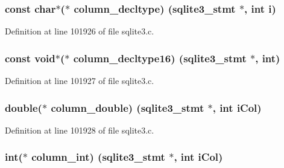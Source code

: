 \subsubsection[{column\+\_\+decltype}]{\setlength{\rightskip}{0pt plus 5cm}const char$\ast$($\ast$ column\+\_\+decltype) ({\bf sqlite3\+\_\+stmt} $\ast$, int i)}\label{structsqlite3__api__routines_ae97b4b0b98a715c66528a87e57160c1e}


Definition at line 101926 of file sqlite3.\+c.

\hypertarget{structsqlite3__api__routines_aa852f9a24c9f0503ae4ba31bbc853fcc}{}
\subsubsection[{column\+\_\+decltype16}]{\setlength{\rightskip}{0pt plus 5cm}const void$\ast$($\ast$ column\+\_\+decltype16) ({\bf sqlite3\+\_\+stmt} $\ast$, int)}\label{structsqlite3__api__routines_aa852f9a24c9f0503ae4ba31bbc853fcc}


Definition at line 101927 of file sqlite3.\+c.

\hypertarget{structsqlite3__api__routines_aa17d48cd9e1033459492792eea5b58e0}{}
\subsubsection[{column\+\_\+double}]{\setlength{\rightskip}{0pt plus 5cm}double($\ast$ column\+\_\+double) ({\bf sqlite3\+\_\+stmt} $\ast$, int i\+Col)}\label{structsqlite3__api__routines_aa17d48cd9e1033459492792eea5b58e0}


Definition at line 101928 of file sqlite3.\+c.

\hypertarget{structsqlite3__api__routines_ab905e24ea0a592436e42d95a9ccf5a66}{}
\subsubsection[{column\+\_\+int}]{\setlength{\rightskip}{0pt plus 5cm}int($\ast$ column\+\_\+int) ({\bf sqlite3\+\_\+stmt} $\ast$, int i\+Col)}\label{structsqlite3__api__routines_ab905e24ea0a592436e42d95a9ccf5a66}


